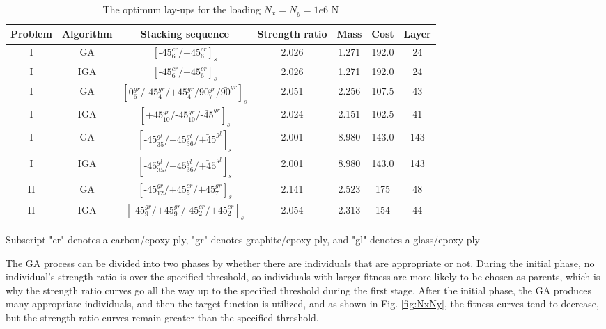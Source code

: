 \documentclass[USenglish]{article}
\begin{document}
\begin{table}
\caption{The optimum lay-ups for the loading $N_x=N_y=1e6$ N}
\begin{tabular}{ccccccc}
	\toprule
	 Problem  &   Algorithm      & Stacking sequence                                    & Strength ratio  & Mass  &  Cost   & Layer    \\ 
	\midrule																								  
	      I   &  GA   &  $[\text{-}45_{6}^{cr}/\text{+}45_{6}^{cr}]_s$                        & 2.026           & 1.271 &  192.0  & 24  \\
	      I   &  IGA   &  $[\text{-}45_{6}^{cr}/\text{+}45_{6}^{cr}]_s$                        & 2.026           & 1.271 &  192.0  & 24  \\
	      I   &  GA    &  $[0_6^{gr}/\text{-}45_{4}^{gr}/\text{+}45_{4}^{gr}/90_{7}^{gr}/\bar{90}^{gr}]_s$     & 2.051           & 2.256 &  107.5  & 43  \\
	      I   &  IGA    &  $[\text{+}45_{10}^{gr}/\text{-}45_{10}^{gr}/\bar{\text{-}45}^{gr}]_s$    & 2.024           & 2.151 &  102.5  & 41  \\
	      I   &  GA    &  $[\text{-}45_{35}^{gl}/\text{+}45_{36}^{gl}/\bar{\text{+}45}^{gl}]_s$    & 2.001           & 8.980 &  143.0  & 143  \\
	      I   &  IGA    &  $[\text{-}45_{35}^{gl}/\text{+}45_{36}^{gl}/\bar{\text{+}45}^{gl}]_s$    & 2.001           & 8.980 &  143.0  & 143  \\
	      II  &  GA    &
	$[\text{-}45_{12}^{gr}/\text{+}45_{5}^{cr}/\text{+}45_{7}^{gr}]_s$         & 2.141
										  & 2.523 & 175& 48  \\
	      II  &  IGA    &
	$[\text{-}45_{9}^{gr}/\text{+}45_{9}^{gr}/\text{-}45_{2}^{cr}/\text{+}45_{2}^{cr}]_s$         & 2.054
										  & 2.313 & 154& 44  \\
	\bottomrule
\end{tabular}
\label{tab:NxNy}
\end{table}
\begin{tablenotes}\footnotesize
\item{Subscript "cr" denotes a carbon/epoxy ply, "gr" denotes graphite/epoxy ply, and "gl" denotes a
glass/epoxy ply}
\end{tablenotes}

The GA process can be divided into two phases by whether there are individuals that are appropriate
or not. During the initial phase, no individual's strength ratio is over the specified threshold, so
individuals with larger fitness are more likely to be chosen as parents, which is why the strength
ratio curves go all the way up to the specified threshold during the first stage. After the initial
phase, the GA produces many appropriate individuals, and then the target function is utilized, and
as shown in Fig. \ref{fig:NxNy}, the fitness curves tend to decrease, but the
strength ratio curves remain greater than the specified threshold.
\end{document}
